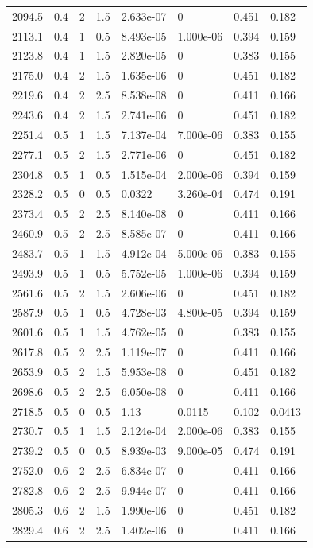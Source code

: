 \documentclass[preview]{standalone}
\begin{document}
{{{\begin{tabular}{L{1.2cm}C{1.2cm} C{0.3cm}C{0.5cm} C{1.4cm}C{1.4cm} C{1.4cm}C{1.4cm}}
  2094.5  &   0.4  & 2     & 1.5 &  2.633e-07  & 0  & 0.451 &  0.182   \\ 
  2113.1  &   0.4  & 1     & 0.5 &  8.493e-05  & 1.000e-06  & 0.394 &  0.159   \\ 
  2123.8  &   0.4  & 1     & 1.5 &  2.820e-05  & 0  & 0.383 &  0.155   \\ 
  2175.0  &   0.4  & 2     & 1.5 &  1.635e-06  & 0  & 0.451 &  0.182   \\ 
  2219.6  &   0.4  & 2     & 2.5 &  8.538e-08  & 0  & 0.411 &  0.166   \\ 
  2243.6  &   0.4  & 2     & 1.5 &  2.741e-06  & 0  & 0.451 &  0.182   \\ 
  2251.4  &   0.5  & 1     & 1.5 &  7.137e-04  & 7.000e-06  & 0.383 &  0.155   \\ 
  2277.1  &   0.5  & 2     & 1.5 &  2.771e-06  & 0  & 0.451 &  0.182   \\ 
  2304.8  &   0.5  & 1     & 0.5 &  1.515e-04  & 2.000e-06  & 0.394 &  0.159   \\ 
  2328.2  &   0.5  & 0     & 0.5 &  0.0322  & 3.260e-04  & 0.474 &  0.191   \\ 
  2373.4  &   0.5  & 2     & 2.5 &  8.140e-08  & 0  & 0.411 &  0.166   \\ 
  2460.9  &   0.5  & 2     & 2.5 &  8.585e-07  & 0  & 0.411 &  0.166   \\ 
  2483.7  &   0.5  & 1     & 1.5 &  4.912e-04  & 5.000e-06  & 0.383 &  0.155   \\ 
  2493.9  &   0.5  & 1     & 0.5 &  5.752e-05  & 1.000e-06  & 0.394 &  0.159   \\ 
  2561.6  &   0.5  & 2     & 1.5 &  2.606e-06  & 0  & 0.451 &  0.182   \\ 
  2587.9  &   0.5  & 1     & 0.5 &  4.728e-03  & 4.800e-05  & 0.394 &  0.159   \\ 
  2601.6  &   0.5  & 1     & 1.5 &  4.762e-05  & 0  & 0.383 &  0.155   \\ 
  2617.8  &   0.5  & 2     & 2.5 &  1.119e-07  & 0  & 0.411 &  0.166   \\ 
  2653.9  &   0.5  & 2     & 1.5 &  5.953e-08  & 0  & 0.451 &  0.182   \\ 
  2698.6  &   0.5  & 2     & 2.5 &  6.050e-08  & 0  & 0.411 &  0.166   \\ 
  2718.5  &   0.5  & 0     & 0.5 &  1.13  & 0.0115  & 0.102 &  0.0413   \\ 
  2730.7  &   0.5  & 1     & 1.5 &  2.124e-04  & 2.000e-06  & 0.383 &  0.155   \\ 
  2739.2  &   0.5  & 0     & 0.5 &  8.939e-03  & 9.000e-05  & 0.474 &  0.191   \\ 
  2752.0  &   0.6  & 2     & 2.5 &  6.834e-07  & 0  & 0.411 &  0.166   \\ 
  2782.8  &   0.6  & 2     & 2.5 &  9.944e-07  & 0  & 0.411 &  0.166   \\ 
  2805.3  &   0.6  & 2     & 1.5 &  1.990e-06  & 0  & 0.451 &  0.182   \\ 
  2829.4  &   0.6  & 2     & 2.5 &  1.402e-06  & 0  & 0.411 &  0.166   \\ 
\hline 
\end{tabular} 

}}}
\end{document}
